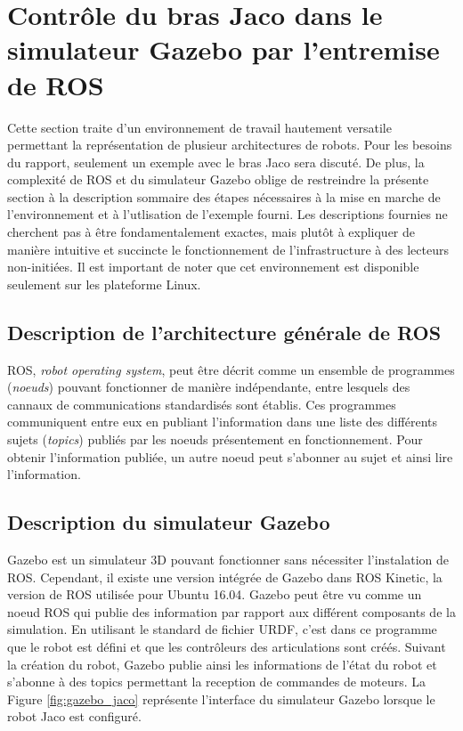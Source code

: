 \documentclass[root.tex]{subfiles}
\begin{document}
\section{Contrôle du bras Jaco dans le simulateur Gazebo par l'entremise de ROS}

Cette section traite d'un environnement de travail hautement versatile permettant la représentation de plusieur architectures de robots.
Pour les besoins du rapport, seulement un exemple avec le bras Jaco sera discuté.
De plus, la complexité de ROS et du simulateur Gazebo oblige de restreindre la présente section à la description sommaire des étapes nécessaires à la mise en marche de l'environnement et à l'utlisation de l'exemple fourni.
Les descriptions fournies ne cherchent pas à être fondamentalement exactes, mais plutôt à expliquer de manière intuitive et succincte le fonctionnement de l'infrastructure à des lecteurs non-initiées.
Il est important de noter que cet environnement est disponible seulement sur les plateforme Linux.

\subsection{Description de l'architecture générale de ROS}

ROS, \textit{robot operating system}, peut être décrit comme un ensemble de programmes (\textit{noeuds}) pouvant fonctionner de manière indépendante, entre lesquels des cannaux de communications standardisés sont établis.
Ces programmes communiquent entre eux en publiant l'information dans une liste des différents sujets (\textit{topics}) publiés par les noeuds présentement en fonctionnement.
Pour obtenir l'information publiée, un autre noeud peut s'abonner au sujet et ainsi lire l'information.

\subsection{Description du simulateur Gazebo}

Gazebo est un simulateur 3D pouvant fonctionner sans nécessiter l'instalation de ROS.
Cependant, il existe une version intégrée de Gazebo dans ROS Kinetic, la version de ROS utilisée pour Ubuntu 16.04.
Gazebo peut être vu comme un noeud ROS qui publie des information par rapport aux différent composants de la simulation.
En utilisant le standard de fichier URDF, c'est dans ce programme que le robot est défini et que les contrôleurs des articulations sont créés.
Suivant la création du robot, Gazebo publie ainsi les informations de l'état du robot et s'abonne à des topics permettant la reception de commandes de moteurs.
La Figure \ref{fig:gazebo_jaco} représente l'interface du simulateur Gazebo lorsque le robot Jaco est configuré.
\end{document}

